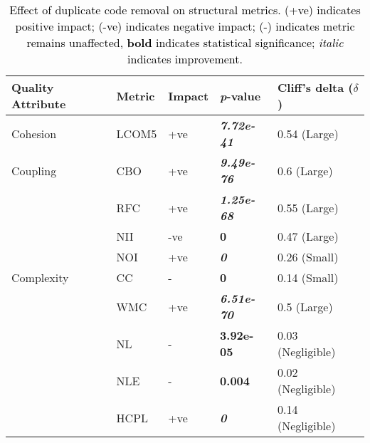 
\begin{table}
  \centering
\caption{\textcolor{black}{Effect of duplicate code removal on structural metrics. (+ve) indicates positive impact; (-ve) indicates negative impact; (-) indicates metric remains unaffected, \textbf{bold} indicates statistical significance; \textit{italic} indicates improvement.}}
\label{Table:Metrics Suites and Metrics Tools Summary}
\begin{adjustbox}{width=1.0\textwidth,center}
\begin{tabular}{lllll}\hline
\toprule
\bfseries Quality Attribute & \bfseries Metric & \bfseries Impact & \bfseries \textit{p}-value & \bfseries Cliff's delta ($\delta$) \\
\midrule
Cohesion &  LCOM5  & +ve & \textit{\textbf{7.72e-41}} & 0.54 (Large)
\\ 
Coupling &  \cellcolor{gray!30}CBO  & \cellcolor{gray!30}+ve & \cellcolor{gray!30}\textit{\textbf{9.49e-76}} & \cellcolor{gray!30}0.6 (Large)
\\
         &  RFC & +ve & \textit{\textbf{1.25e-68}}  & 0.55 (Large)

\\
         &  \cellcolor{gray!30}NII & \cellcolor{gray!30}-ve &  \cellcolor{gray!30}\textbf{0} & \cellcolor{gray!30}0.47 (Large)

\\
         &  NOI & +ve & \textit{\textbf{0}}  & 0.26 (Small)

\\
Complexity &  \cellcolor{gray!30}CC & \cellcolor{gray!30}- & \cellcolor{gray!30}\textbf{0} & \cellcolor{gray!30}0.14 (Small)

\\
           &  WMC & +ve & \textit{\textbf{6.51e-70}} & 0.5 (Large)

\\
         &  \cellcolor{gray!30}NL &  \cellcolor{gray!30}- &  \cellcolor{gray!30}\textbf{3.92e-05}&  \cellcolor{gray!30}0.03 (Negligible)

\\
         &  NLE &  - & \textbf{0.004}  & 0.02 (Negligible)

\\
         &  \cellcolor{gray!30}HCPL & \cellcolor{gray!30}+ve &  \cellcolor{gray!30}\textit{\textbf{0}} &  \cellcolor{gray!30}0.14 (Negligible)


\end{tabular}
\end{adjustbox}
\end{table}

